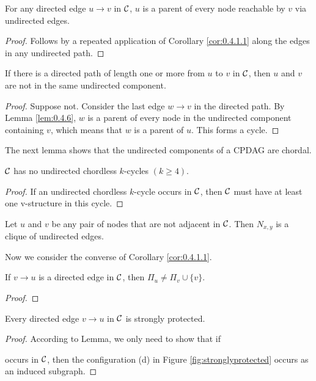 \begin{lemma}\label{lem:0.4.6}
    For any directed edge $u \rightarrow v$ in $\mathcal{C}$, $u$ is a parent of every node reachable by $v$ via undirected edges.
\end{lemma}
\begin{proof}
    Follows by a repeated application of Corollary \ref*{cor:0.4.1.1} along the edges in any undirected path.
\end{proof}

\begin{lemma}\label{lem:0.4.7}
    If there is a directed path of length one or more from $u$ to $v$ in $\mathcal{C}$, then $u$ and $v$ are not in the same undirected component.
\end{lemma}
\begin{proof}
    Suppose not. Consider the last edge $w \rightarrow v$ in the directed path. By Lemma \ref*{lem:0.4.6}, $w$ is a parent of every node in the undirected component containing $v$, which means that $w$ is a parent of $u$. This forms a cycle.
\end{proof}

The next lemma shows that the undirected components of a CPDAG are chordal.
\begin{lemma}\label{lem:0.4.5}
    $\mathcal{C}$ has no undirected chordless $k$-cycles $(k\geq 4)$.
\end{lemma}
\begin{proof}
    If an undirected chordless $k$-cycle occurs in $\mathcal{C}$, then $\mathcal{C}$ must have at least one v-structure in this cycle.
\end{proof}

\begin{corollary}
    Let $u$ and $v$ be any pair of nodes that are not adjacent in $\mathcal{C}$. Then $N_{x,y}$ is a clique of undirected edges.
\end{corollary}

Now we consider the converse of Corollary \ref*{cor:0.4.1.1}.

\begin{lemma}
    If $v\rightarrow u$ is a directed edge in $\mathcal{C}$, then $\Pi_u\neq \Pi_v\cup\{v\}$.
\end{lemma}
\begin{proof}
    
\end{proof}


\begin{lemma}
    Every directed edge $v\rightarrow u$ in $\mathcal{C}$ is strongly protected.
\end{lemma}
\begin{proof}
    According to Lemma, we only need to show that if  occurs in $\mathcal{C}$, then the configuration (d) in Figure \ref{fig:stronglyprotected} occurs as an induced subgraph.
\end{proof}


